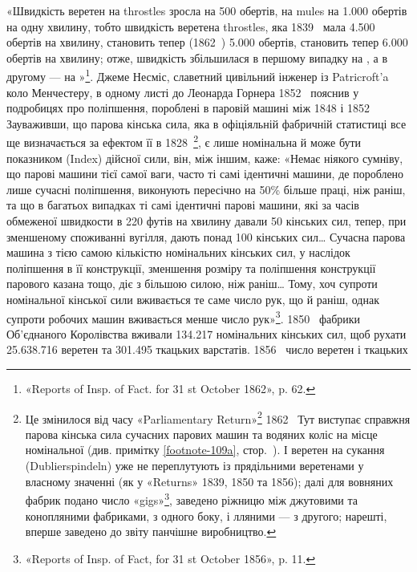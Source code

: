 «Швидкість веретен на throstles зросла на 500 обертів, на
mules на \num{1.000} обертів на одну хвилину, тобто швидкість веретена
throstles, яка 1839~ мала \num{4.500} обертів на хвилину, становить
тепер (1862~) \num{5.000} обертів, становить тепер \num{6.000} обертів на хвилину; отже,
швидкість збільшилася в першому випадку на , а в другому —
на »\footnote{
«Reports of Insp. of Fact. for 31 st October 1862», p. 62.
}. Джеме Несміс, славетний цивільний інженер із
Patricroft’a коло Менчестеру, в одному листі до Леонарда Горнера
1852~ пояснив у подробицях про поліпшення, пороблені в паровій
машині між 1848 і 1852~ Зауваживши, що парова кінська
сила, яка в офіціяльній фабричній статистиці все ще визначається
за ефектом її в 1828~\footnote{
Це змінилося від часу «Parliamentary Return»\footnote*{
парляментського звіту. \emph{Ред.}
} 1862~ Тут виступає справжня парова кінська сила сучасних парових машин
та водяних коліс на місце номінальної (див. примітку \ref{footnote-109a}, стор.~\pageref{footnote-109a}). І веретен
на сукання (Dublierspindeln) уже не переплутують із прядільними веретенами
у власному значенні (як у «Returns» 1839, 1850 та 1856); далі
для вовняних фабрик подано число «gigs»\footnote*{
ворсувальних машин. \emph{Ред.}
}, заведено ріжницю між джутовими та конопляними фабриками, з одного боку, і лляними — з другого;
нарешті, вперше заведено до звіту панчішне виробництво.
}, є лише номінальна й може бути
показником (Index) дійсної сили, він, між іншим, каже:
«Немає ніякого сумніву, що парові машини тієї самої ваги, часто
ті самі ідентичні машини, де пороблено лише сучасні поліпшення,
виконують пересічно на 50\% більше праці, ніж раніш, та що в
багатьох випадках ті самі ідентичні парові машини, які за часів
обмеженої швидкости в 220 футів на хвилину давали 50 кінських
сил, тепер, при зменшеному споживанні вугілля, дають понад 100
кінських сил\dots{} Сучасна парова машина з тією самою кількістю
номінальних кінських сил, у наслідок поліпшення в її конструкції,
зменшення розміру та поліпшення конструкції парового
казана тощо, діє з більшою силою, ніж раніш\dots{} Тому, хоч супроти
номінальної кінської сили вживається те саме число рук, що й
раніш, однак супроти робочих машин вживається менше число
рук»\footnote{
«Reports of Insp. of Fact, for 31 st October 1856», p. 11.
}. 1850~ фабрики Об’єднаного Королівства вживали \num{134.217}
номінальних кінських сил, щоб рухати \num{25.638.716} веретен та
\num{301.495} ткацьких варстатів. 1856~ число веретен і ткацьких
